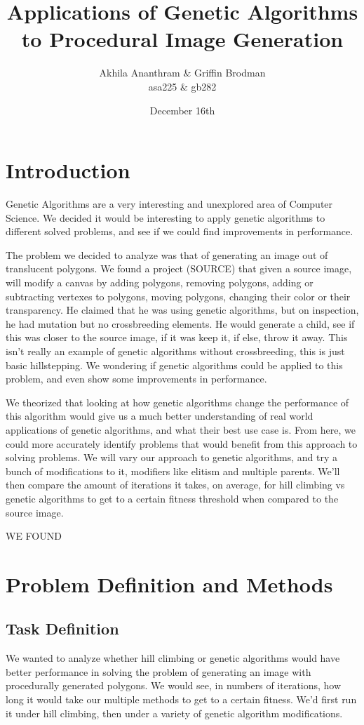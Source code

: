 \documentclass[12pt,letterpaper]{article}
\author{Akhila Ananthram $\&$ Griffin Brodman\\asa225 $\&$ gb282}
\title{Applications of Genetic Algorithms to Procedural Image Generation }
\date{December 16th}
\begin{document}
\maketitle
\section{Introduction}
Genetic Algorithms are a very interesting and unexplored area of Computer Science. We decided it would be interesting to apply genetic algorithms to different solved problems, and see if we could find improvements in performance. 

The problem we decided to analyze was that of generating an image out of translucent polygons. We found a project (SOURCE) that given a source image, will modify a canvas by adding polygons, removing polygons, adding or subtracting vertexes to polygons, moving polygons, changing their color or their transparency. He claimed that he was using genetic algorithms, but on inspection, he had mutation but no crossbreeding elements. He would generate a child, see if this was closer to the source image, if it was keep it, if else, throw it away. This isn't really an example of genetic algorithms without crossbreeding, this is just basic hillstepping. We wondering if genetic algorithms could be applied to this problem, and even show some improvements in performance. 

We theorized that looking at how genetic algorithms change the performance of this algorithm would give us a much better understanding of real world applications of genetic algorithms, and what their best use case is. From here, we could more accurately identify problems that would benefit from this approach to solving problems. We will vary our approach to genetic algorithms, and try a bunch of modifications to it, modifiers like elitism and multiple parents. We'll then compare the amount of iterations it takes, on average, for hill climbing vs genetic algorithms to get to a certain fitness threshold when compared to the source image.

WE FOUND


\section{Problem Definition and Methods}

\subsection{Task Definition}
We wanted to analyze whether hill climbing or genetic algorithms would have better performance in solving the problem of generating an image with procedurally generated polygons. We would see, in numbers of iterations, how long it would take our multiple methods to get to a certain fitness. We'd first run it under hill climbing, then under a variety of genetic algorithm modifications.
\end{document}
